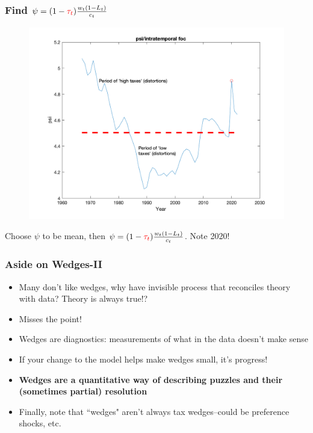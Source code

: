 \documentclass{beamer}
\begin{document}
\begin{frame}
\frametitle[alignment=center]{Find $\psi=(1-\textcolor{red}{\tau_t})\frac{w_t(1-L_t)}{c_t}$}
\begin{figure}
\centering
\includegraphics[scale=0.5]{Figures/Figure_6b.png}
\end{figure}
Choose $\psi$ to be mean, then $\psi=(1-\textcolor{red}{\tau_t})\frac{w_t(1-L_t)}{c_t}$. Note 2020!
\end{frame}


\begin{frame}
\frametitle[alignment=center]{Aside on Wedges-II}
\begin{itemize}
\item Many don't like wedges, why have invisible process that reconciles theory with data? Theory is always true!?
\bigskip
\item Misses the point!
\bigskip
\item Wedges are diagnostics: measurements of what in the data doesn't make sense
\bigskip
\item  If your change to the model helps make wedges small, it's progress!
\bigskip
\item \textbf{Wedges are a quantitative way of describing puzzles and their (sometimes partial) resolution}
\bigskip
\item Finally, note that ``wedges" aren't always tax wedges--could be preference shocks, etc.  
\end{itemize}
\end{frame}
\end{document}
